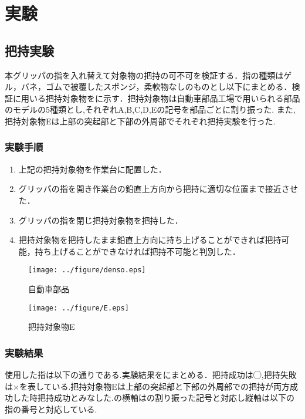 \section{実験}
\label{sec:実験}
\subsection{把持実験}
本グリッパの指を入れ替えて対象物の把持の可不可を検証する．指の種類はゲル，バネ，ゴムで被覆したスポンジ，柔軟物なしのものとし以下にまとめる．検証に用いる把持対象物をに示す．把持対象物は自動車部品工場で用いられる部品のモデルの5種類とし,それぞれA,B,C,D,Eの記号を部品ごとに割り振った.
また,把持対象物Eは上部の突起部と下部の外周部でそれぞれ把持実験を行った.



\subsubsection{実験手順}

\begin{enumerate}
  \item 上記の把持対象物を作業台に配置した．  
  \item グリッパの指を開き作業台の鉛直上方向から把持に適切な位置まで接近させた． 
  \item グリッパの指を閉じ把持対象物を把持した．
  \item 把持対象物を把持したまま鉛直上方向に持ち上げることができれば把持可能，持ち上げることができなければ把持不可能と判別した．
\end{enumerate}

\begin{figure}[h]
 \begin{center}
  \texttt{[image: ../figure/denso.eps]}
 \caption{自動車部品}
  \label{fig::denso_parts}
 \end{center}
\end{figure}

\begin{figure}[h]
 \begin{center}
  \texttt{[image: ../figure/E.eps]}
 \caption{把持対象物E}
  \label{fig::E}
 \end{center}
\end{figure}

\newpage


\subsubsection{実験結果}
使用した指は以下の通りである.実験結果をにまとめる．把持成功は◯,把持失敗は×を表している.把持対象物Eは上部の突起部と下部の外周部での把持が両方成功した時把持成功とみなした.の横軸はの割り振った記号と対応し縦軸は以下の指の番号と対応している.

